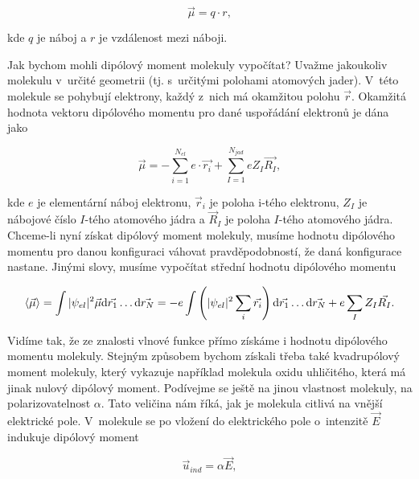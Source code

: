 \begin{equation}
\vec{\mu} = q \cdot r,
\label{rov:Vl-3}
\end{equation}

\noindent kde $q$ je náboj a $r$ je vzdálenost mezi náboji. 

Jak bychom mohli dipólový moment molekuly vypočítat? Uvažme jakoukoliv molekulu v~určité geometrii (tj. s~určitými polohami atomových jader). V~této molekule se pohybují elektrony, každý z~nich má okamžitou polohu $\vec{r}$. Okamžitá hodnota vektoru dipólového momentu pro dané uspořádání elektronů je dána jako

\begin{equation}
\vec{\mu} = - \sum_{i=1}^{N_{el}} e \cdot \vec{r_i} + \sum_{I=1}^{N_{jad}} e Z_I \vec{R_I},
\label{rov:Vl-4}
\end{equation}

\noindent kde $e$ je elementární náboj elektronu, $\vec{r}_i$ je poloha i-tého elektronu, $Z_I$ je nábojové číslo $I$-tého atomového jádra a $\vec{R}_I$ je poloha $I$-tého atomového jádra. Chceme-li nyní získat dipólový moment molekuly, musíme hodnotu dipólového momentu pro danou konfiguraci váhovat pravděpodobností, že daná konfigurace nastane. Jinými slovy, musíme vypočítat střední hodnotu dipólového momentu

\begin{equation}
\braket{\vec{\mu}} = \int \vert \psi_{el} \vert^2 \vec{\mu} \mathrm{d} \vec{r_1} \dots \mathrm{d} \vec{r_N} = - e \int \left( \vert \psi_{el} \vert^2 \sum_{i} \vec{r_i} \right) \mathrm{d} \vec{r_1} \dots \mathrm{d} \vec{r_N} + e \sum_{I} Z_I \vec{R_I}.
\label{rov:Vl-5}
\end{equation}

Vidíme tak, že ze znalosti vlnové funkce přímo získáme i hodnotu dipólového momentu molekuly. Stejným způsobem bychom získali třeba také kvadrupólový moment molekuly, který vykazuje například molekula oxidu uhličitého, která má jinak nulový dipólový moment. Podívejme se ještě na jinou vlastnost molekuly, na polarizovatelnost $\alpha$. Tato veličina nám říká, jak je molekula citlivá na vnější elektrické pole. V~molekule se po vložení do elektrického pole o~intenzitě $\vec{E}$ indukuje dipólový moment

\begin{equation}
\vec{u}_{ind} = \alpha \vec{E},
\label{rov:Vl-6}
\end{equation}

